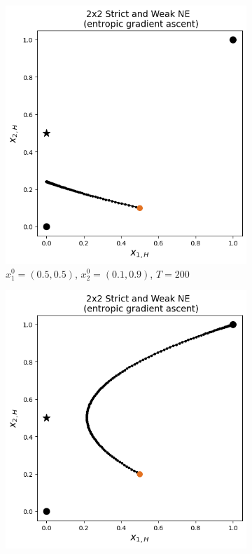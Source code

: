 \begin{figure}[ht]
\captionsetup{justification=centering}
\centering
\begin{subfigure}{.5\textwidth}
    \centering
    \includegraphics[width=\textwidth]{logos/Weak5.png}
    \caption{$x_{1}^0 = (0.5,0.5)$, $x_{2}^0 = (0.1,0.9)$, $T = 200$}
    \label{fig:Weak3a}
\end{subfigure}%
\begin{subfigure}{.5\textwidth}
    \centering
    \includegraphics[width=\textwidth]{logos/Weak6.png}

\end{subfigure}
\end{figure}
